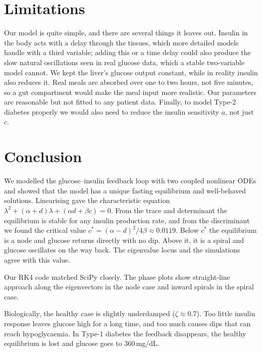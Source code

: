 \documentclass[11pt,a4paper]{article}
\newcommand{\cs}{c^{*}}
\begin{document}
\section{Limitations}\label{sec:limits}
Our model is quite simple, and there are several things it leaves out. Insulin in the body acts with a delay through the tissues, which more detailed models handle with a third variable; adding this or a time delay could also produce the slow natural oscillations seen in real glucose data, which a stable two-variable model cannot. We kept the liver's glucose output constant, while in reality insulin also reduces it. Real meals are absorbed over one to two hours, not five minutes, so a gut compartment would make the meal input more realistic. Our parameters are reasonable but not fitted to any patient data. Finally, to model Type-2 diabetes properly we would also need to reduce the insulin sensitivity $a$, not just $c$.

\section{Conclusion}\label{sec:conclusion}
We modelled the glucose--insulin feedback loop with two coupled nonlinear ODEs and showed that the model has a unique fasting equilibrium and well-behaved solutions. Linearising gave the characteristic equation $\lambda^2+(\alpha+d)\lambda+(\alpha d+\beta c)=0$. From the trace and determinant the equilibrium is stable for any insulin production rate, and from the discriminant we found the critical value $\cs=(\alpha-d)^2/4\beta\approx0.0119$. Below $\cs$ the equilibrium is a node and glucose returns directly with no dip. Above it, it is a spiral and glucose oscillates on the way back. The eigenvalue locus and the simulations agree with this value.

Our RK4 code matched SciPy closely. The phase plots show straight-line approach along the eigenvectors in the node case and inward spirals in the spiral case.

Biologically, the healthy case is slightly underdamped ($\zeta\approx0.7$). Too little insulin response leaves glucose high for a long time, and too much causes dips that can reach hypoglycaemia. In Type-1 diabetes the feedback disappears, the healthy equilibrium is lost and glucose goes to $360$\,mg/dL.

\end{document}
